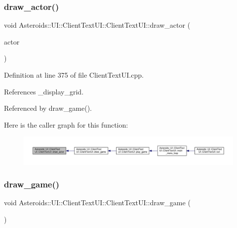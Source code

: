 \subsubsection{\texorpdfstring{draw\+\_\+actor()}{draw\_actor()}}
{\footnotesize\ttfamily void Asteroids\+::\+U\+I\+::\+Client\+Text\+U\+I\+::\+Client\+Text\+U\+I\+::draw\+\_\+actor (\begin{DoxyParamCaption}\item[{std\+::shared\+\_\+ptr$<$ \hyperlink{classAsteroids_1_1Domain_1_1Game_1_1Actors_1_1ActorInterface}{Asteroids\+::\+Domain\+::\+Game\+::\+Actors\+::\+Actor\+Interface} $>$}]{actor }\end{DoxyParamCaption})\hspace{0.3cm}{\ttfamily [private]}}



Definition at line 375 of file Client\+Text\+U\+I.\+cpp.



References \+\_\+display\+\_\+grid.



Referenced by draw\+\_\+game().

Here is the caller graph for this function\+:\nopagebreak
\begin{figure}[H]
\begin{center}
\leavevmode
\includegraphics[width=350pt]{classAsteroids_1_1UI_1_1ClientTextUI_1_1ClientTextUI_a6157c8167618db7195c35479096620ec_icgraph}
\end{center}
\end{figure}
\mbox{\label{classAsteroids_1_1UI_1_1ClientTextUI_1_1ClientTextUI_a68028ff6a5b6d38321496c83ff872158}} 
\subsubsection{\texorpdfstring{draw\+\_\+game()}{draw\_game()}}
{\footnotesize\ttfamily void Asteroids\+::\+U\+I\+::\+Client\+Text\+U\+I\+::\+Client\+Text\+U\+I\+::draw\+\_\+game (\begin{DoxyParamCaption}{ }\end{DoxyParamCaption})\hspace{0.3cm}{\ttfamily [private]}}



